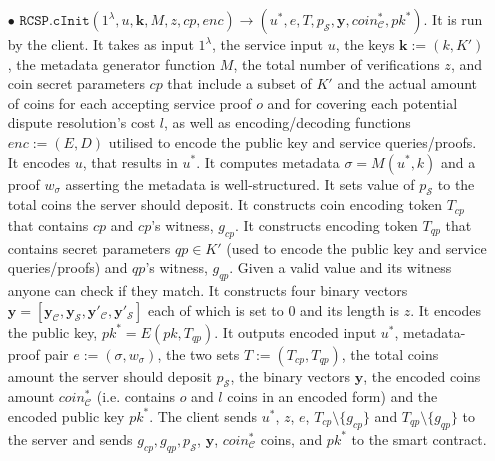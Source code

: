 \begin{definition}[RC-S-P Scheme]
\begin{itemize}
\item[$\bullet$] $\mathtt{RCSP}.\mathtt{cInit}(1^\lambda, u,\bm{k}, M,z,cp,enc)\rightarrow (u^{\scriptscriptstyle *},e,T, p_{\scriptscriptstyle\mathcal S},  \bm{y}, coin^{\scriptscriptstyle*}_{\scriptscriptstyle\mathcal C},pk^{\scriptscriptstyle *})$. It is run by the client. It takes as input $1^\lambda$,  the service input $u$,  the keys  $\bm{k}:=(k, K')$,  the metadata generator function $M$, the total number of verifications $z$, and coin secret parameters $cp$ that include a subset of  $K'$ and the actual amount of coins for each accepting service proof $o$ and  for covering each potential dispute resolution's cost $l$, as well as encoding/decoding functions $enc:=(E,D)$ utilised to encode the public key and service queries/proofs.  It encodes $u$, that results in $u^{\scriptscriptstyle *}$.  It computes metadata $\sigma=M(u^{\scriptscriptstyle *},k)$ and a  proof $w_{\scriptscriptstyle\sigma}$ asserting the metadata is well-structured. It sets value of $p_{\scriptscriptstyle\mathcal S}$ to the total coins the server should deposit. It constructs coin encoding token $T_{\scriptscriptstyle cp}$ that contains   $cp$ and   $cp$'s witness, $g_{\scriptscriptstyle cp}$.  It   constructs  encoding token $T_{\scriptscriptstyle qp}$ that contains  secret  parameters $qp\in K'$ (used to encode the public key and service queries/proofs)  and     $qp$'s witness,  $g_{\scriptscriptstyle qp}$.   Given a valid value and its witness  anyone can check if they match. It constructs four binary vectors $\bm{y}=[\bm{y}_{\scriptscriptstyle \mathcal  C}, \bm{y}_{\scriptscriptstyle \mathcal  S},\bm{y}'_{\scriptscriptstyle \mathcal  C}, \bm{y}'_{\scriptscriptstyle \mathcal  S}]$ each of which is set to $0$ and its length is $z$.  It encodes the public key,  $pk^{\scriptscriptstyle *}=E(pk,T_{\scriptscriptstyle qp})$. It outputs encoded input $u^{\scriptscriptstyle *}$, metadata-proof pair $e:=(\sigma,w_{\scriptscriptstyle\sigma})$, the two sets $T:=(T_{\scriptscriptstyle cp},T_{\scriptscriptstyle qp})$, the total coins amount the server should deposit $p_{\scriptscriptstyle\mathcal S}$, the  binary vectors $\bm{y}$,   the encoded coins amount  $coin^{\scriptscriptstyle*}_{\scriptscriptstyle\mathcal C}$ (i.e. contains $o$ and $l$ coins in an encoded form) and the encoded public key $pk^{\scriptscriptstyle *}$. The client sends  $u^{\scriptscriptstyle *}$, $z$,  $e$, $T_{\scriptscriptstyle cp} \setminus  \{g_{\scriptscriptstyle cp}\}$ and $T_{\scriptscriptstyle qp} \setminus  \{g_{\scriptscriptstyle qp}\}$ to the server and  sends $g_{\scriptscriptstyle cp},  g_{\scriptscriptstyle qp},p_{\scriptscriptstyle\mathcal S}$, $\bm{y}$,   $coin^{\scriptscriptstyle*}_{\scriptscriptstyle\mathcal C}$  coins, and $pk^{\scriptscriptstyle *}$ to the smart contract. 




\end{itemize}
\end{definition}
